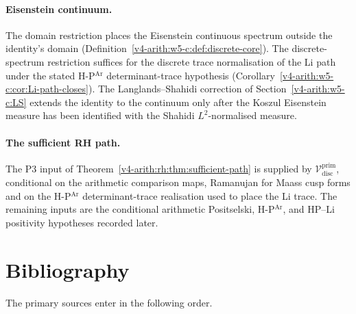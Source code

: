 \paragraph{Eisenstein continuum.}
The domain restriction places the Eisenstein continuous spectrum
outside the identity's domain (Definition~\ref{v4-arith:w5-c:def:discrete-core}).
The discrete-spectrum restriction suffices for the discrete trace
normalisation of the Li path under the stated H-P\(^{\mathrm{Ar}}\)
determinant-trace hypothesis
(Corollary~\ref{v4-arith:w5-c:cor:Li-path-closes}). The Langlands--Shahidi
correction of Section~\ref{v4-arith:w5-c:LS} extends the identity to
the continuum only after the Koszul Eisenstein measure has been
identified with the Shahidi \(L^{2}\)-normalised measure.

\paragraph{The sufficient RH path.}
The P3 input of Theorem~\ref{v4-arith:rh:thm:sufficient-path} is supplied by
\(\mathcal{V}^{\mathrm{prim}}_{\mathrm{disc}}\), conditional on the arithmetic comparison maps,
Ramanujan for Maass cusp forms and on the H-P\(^{\mathrm{Ar}}\)
determinant-trace realisation used to place the Li trace. The remaining inputs
are the conditional arithmetic Positselski, H-P\(^{\mathrm{Ar}}\), and
HP--Li positivity hypotheses recorded later.

\section{Bibliography}
\label{v4-arith:w5-c:bibliography}

The primary sources enter in the following order.

